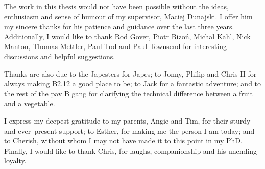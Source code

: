 
\begin{acknowledgements}      

The work in this thesis would not have been possible without the ideas, enthusiasm and sense of humour of my supervisor, Maciej Dunajski. I offer him my sincere thanks for his patience and guidance over the last three years. Additionally, I would like to thank Rod Gover, Piotr Bizo\'n, Michal Kahl, Nick Manton, Thomas Mettler, Paul Tod and Paul Townsend for interesting discussions and helpful suggestions.

Thanks are also due to the Japesters for Japes; to Jonny, Philip and Chris H for always making B2.12 a good place to be; to Jack for a fantastic adventure; and to the rest of the pav B gang for clarifying the technical difference between a fruit and a vegetable.

I express my deepest gratitude to my parents, Angie and Tim, for their sturdy and ever--present support; to Esther, for making me the person I am today; and to Cherish, without whom I may not have made it to this point in my PhD. Finally, I would like to thank Chris, for laughs, companionship and his unending loyalty.



\end{acknowledgements}

